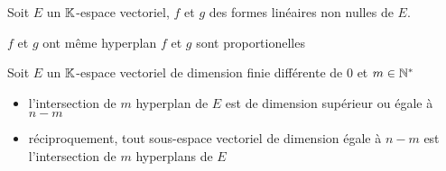 \begin{prp}
Soit $E$ un $\mathbb{K}$-espace vectoriel, $f$ et $g$ des formes linéaires non 
nulles de $E$.

$f$ et $g$ ont même hyperplan \ssi $f$ et $g$ sont proportionelles
\end{prp}

\begin{prp}
Soit $E$ un $\mathbb{K}$-espace vectoriel de dimension finie différente de $0$ et
$m \in \mathbb{N}^*$

\begin{itemize}
    \item l'intersection de $m$ hyperplan de $E$ est de dimension 
    supérieur ou égale à $n - m$
    \item réciproquement, tout sous-espace vectoriel de dimension
    égale à $n - m$ est l'intersection de $m$ hyperplans de $E$
\end{itemize}
\end{prp}


